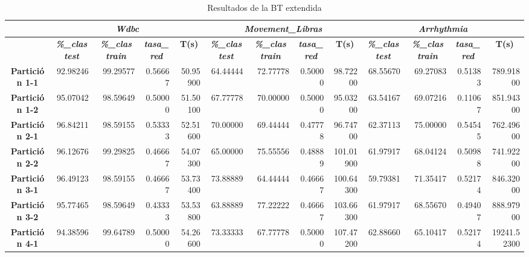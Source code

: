 \documentclass[a4paper,11pt]{article}
\begin{document}
  \begin{table}[H]	
    \caption*{Resultados de la BT extendida}
    \begin{adjustbox}{width=1.1\textwidth}
   \begin{tabular}{|c|r|r|r|r|r|r|r|r|r|r|r|r|}
    \hline
    \multicolumn{1}{|l|}{} & \multicolumn{ 4}{c|}{\textbf{\textit{Wdbc}}} & \multicolumn{ 4}{c|}{\textbf{\textit{Movement\_Libras}}} & \multicolumn{ 4}{c|}{\textbf{\textit{Arrhythmia}}} \\ \hline
    & \multicolumn{1}{c|}{\textbf{\textit{\%\_clas test}}} & \multicolumn{1}{c|}{\textbf{\textit{\%\_clas train}}} & \multicolumn{1}{c|}{\textbf{\textit{tasa\_red}}} & \multicolumn{1}{c|}{\textbf{T(s)}} & \multicolumn{1}{c|}{\textbf{\textit{\%\_clas test}}} & \multicolumn{1}{c|}{\textbf{\textit{\%\_clas train}}} & \multicolumn{1}{c|}{\textbf{\textit{tasa\_red}}} & \multicolumn{1}{c|}{\textbf{T(s)}} & \multicolumn{1}{c|}{\textbf{\textit{\%\_clas test}}} & \multicolumn{1}{c|}{\textbf{\textit{\%\_clas train}}} & \multicolumn{1}{c|}{\textbf{\textit{tasa\_red}}} & \multicolumn{1}{c|}{\textbf{T(s)}} \\ \hline
    \textbf{Partición 1-1} & 92.98246 & 99.29577 & 0.56667 & 50.95900 & 64.44444 & 72.77778 & 0.50000 & 98.72200 & 68.55670 & 69.27083 & 0.51383 & 789.91800 \\ \hline
    \textbf{Partición 1-2} & 95.07042 & 98.59649 & 0.50000 & 51.50100 & 67.77778 & 70.00000 & 0.50000 & 95.03200 & 63.54167 & 69.07216 & 0.11067 & 851.94300 \\ \hline
    \textbf{Partición 2-1} & 96.84211 & 98.59155 & 0.53333 & 52.51600 & 70.00000 & 69.44444 & 0.47778 & 96.74700 & 62.37113 & 75.00000 & 0.54545 & 762.49600 \\ \hline
    \textbf{Partición 2-2} & 96.12676 & 99.29825 & 0.46667 & 54.07300 & 65.00000 & 75.55556 & 0.48889 & 101.01900 & 61.97917 & 68.04124 & 0.50988 & 741.92200 \\ \hline
    \textbf{Partición 3-1} & 96.49123 & 98.59155 & 0.46667 & 53.73400 & 73.88889 & 64.44444 & 0.46667 & 100.64300 & 59.79381 & 71.35417 & 0.52174 & 846.32000 \\ \hline
    \textbf{Partición 3-2} & 95.77465 & 98.59649 & 0.43333 & 53.53800 & 63.88889 & 77.22222 & 0.46667 & 103.66300 & 61.97917 & 68.55670 & 0.49407 & 888.97900 \\ \hline
    \textbf{Partición 4-1} & 94.38596 & 99.64789 & 0.50000 & 54.26600 & 73.33333 & 67.77778 & 0.50000 & 107.47200 & 62.88660 & 65.10417 & 0.52174 & 19241.52300 \\ \hline

\end{tabular}
\end{adjustbox}
\end{table}
\end{document}
